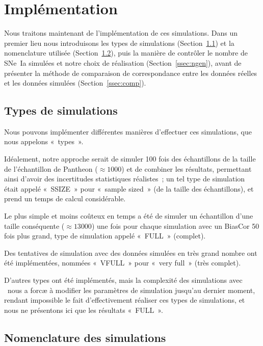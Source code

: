 \documentclass[../main/main.tex]{subfiles}
\begin{document}
\section{Implémentation}\label{sec:snaimpl} 

Nous traitons maintenant de l'implémentation de ces simulations. Dans un premier
lieu nous introduisons les types de simulations (Section~\ref{ssec:type}) et la
nomenclature utilisée (Section~\ref{ssec:nom}), puis la manière de contrôler le
nombre de SNe~Ia simulées et notre choix de réalisation
(Section~\ref{ssec:ngen}), avant de présenter la méthode de comparaison de
correspondance entre les données réelles et les données simulées
(Section~\ref{ssec:comp}).

\subsection{Types de simulations}\label{ssec:type}

Nous pouvons implémenter différentes manières d'effectuer ces simulations, que
nous appelons «~types~».

Idéalement, notre approche serait de simuler 100 fois des échantillons de la
taille de l'échantillon de Pantheon ($\approx \num{1000}$) et de combiner les
résultats, permettant ainsi d'avoir des incertitudes statistiques réalistes~; un
tel type de simulation était appelé «~SSIZE~» pour «~sample sized~» (de la
taille des échantillons), et prend un temps de calcul considérable.

Le plus simple et moins coûteux en temps a été de simuler un échantillon d'une
taille conséquente ($\approx \num{13 000}$) une fois pour chaque simulation avec
un BiasCor 50 fois plus grand, type de simulation appelé «~FULL~» (complet).

Des tentatives de simulation avec des données simulées en très grand nombre ont
été implémentées, nommées «~VFULL~» pour «~very full~» (très complet).

D'autres types ont été implémentés, mais la complexité des simulations avec
\snana\ nous a forcæ à modifier les paramètres de simulation jusqu'au dernier
moment, rendant impossible le fait d'effectivement réaliser ces types de
simulations, et nous ne présentons ici que les résultats «~FULL~».

\subsection{Nomenclature des simulations}\label{ssec:nom}
\end{document}
